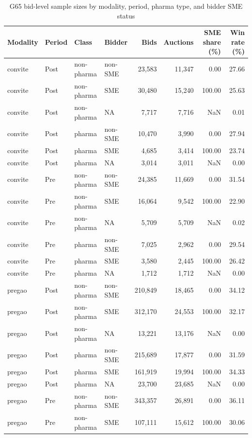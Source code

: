 \begin{table}[htbp]
\centering
\begin{threeparttable}
\caption{G65 bid-level sample sizes by modality, period, pharma type, and bidder SME status}
\label{tab:v3_pharma_counts}
\scriptsize
\setlength{\tabcolsep}{3pt}
\begin{tabular}{llllrrrr}
\toprule
Modality & Period & Class & Bidder & Bids & Auctions & SME share (\%) & Win rate (\%) \\
\midrule
convite & Post & non-pharma & non-SME & 23,583 & 11,347 & 0.00 & 27.66 \\
convite & Post & non-pharma & SME & 30,480 & 15,240 & 100.00 & 25.63 \\
convite & Post & non-pharma & NA & 7,717 & 7,716 & NaN & 0.01 \\
convite & Post & pharma & non-SME & 10,470 & 3,990 & 0.00 & 27.94 \\
convite & Post & pharma & SME & 4,685 & 3,414 & 100.00 & 23.74 \\
convite & Post & pharma & NA & 3,014 & 3,011 & NaN & 0.00 \\
convite & Pre & non-pharma & non-SME & 24,385 & 11,669 & 0.00 & 31.54 \\
convite & Pre & non-pharma & SME & 16,064 & 9,542 & 100.00 & 22.90 \\
convite & Pre & non-pharma & NA & 5,709 & 5,709 & NaN & 0.02 \\
convite & Pre & pharma & non-SME & 7,025 & 2,962 & 0.00 & 29.54 \\
convite & Pre & pharma & SME & 3,580 & 2,445 & 100.00 & 26.42 \\
convite & Pre & pharma & NA & 1,712 & 1,712 & NaN & 0.00 \\
pregao & Post & non-pharma & non-SME & 210,849 & 18,465 & 0.00 & 34.12 \\
pregao & Post & non-pharma & SME & 312,170 & 24,553 & 100.00 & 32.17 \\
pregao & Post & non-pharma & NA & 13,221 & 13,176 & NaN & 0.00 \\
pregao & Post & pharma & non-SME & 215,689 & 17,877 & 0.00 & 31.59 \\
pregao & Post & pharma & SME & 161,919 & 19,994 & 100.00 & 34.33 \\
pregao & Post & pharma & NA & 23,700 & 23,685 & NaN & 0.00 \\
pregao & Pre & non-pharma & non-SME & 343,357 & 26,891 & 0.00 & 36.11 \\
pregao & Pre & non-pharma & SME & 107,111 & 15,612 & 100.00 & 30.06 \\

\end{tabular}
\end{threeparttable}
\end{table}
